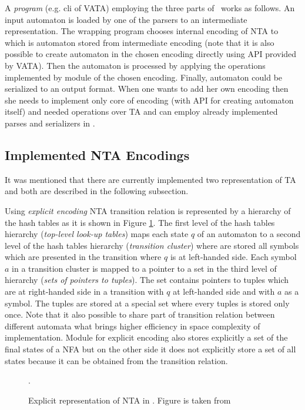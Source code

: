 A \emph{program} (e.g. cli of VATA) employing the three parts of \vata\ works as follows.
An input automaton is loaded by one of the parsers to an intermediate representation.
The wrapping program chooses internal encoding of NTA to which is automaton stored from intermediate encoding (note that it is also
possible to create automaton in the chosen encoding directly using API provided by VATA).
Then the automaton is processed by applying the operations implemented by module of the chosen encoding.
Finally, automaton could be serialized to an output format.
When one wants to add her own encoding then she needs to implement only core of encoding (with API for creating automaton itself)
and needed operations over TA and can employ already implemented parses and serializers in \vata.

\subsection{Implemented NTA Encodings}

It was mentioned that there are currently implemented two representation of TA and both are described in the following subsection.

Using \emph{explicit encoding} NTA transition relation is represented by a hierarchy of the hash tables as it is shown in Figure \ref{fig:explnta}.
The first level of the hash tables hierarchy (\emph{top-level look-up tables}) maps each state $q$ of an automaton to 
a second level of the hash tables hierarchy (\emph{transition cluster}) where are stored all symbols which
are presented in the transition where $q$ is at left-handed side.
Each symbol $a$ in a transition cluster is mapped to a pointer to a set in the third level of hierarchy (\emph{sets of pointers to tuples}).
The set contains pointers to tuples which are at right-handed side in a transition with $q$ at left-handed side and with $a$ as a symbol.
The tuples are stored at a special set where every tuples is stored only once.
Note that it also possible to share part of transition relation between different automata what
brings higher efficiency in space complexity of implementation.
Module for explicit encoding also stores explicitly a set of the final states of a NFA but on
the other side it does not explicitly store a set of all states because it can be obtained from the transition relation.

\begin{figure}[bt]
\begin{center}

	\caption{Explicit representation of NTA in \vata. Figure is taken from \cite{libvata}}.
	\label{fig:explnta}
\end{center}
\end{figure}

